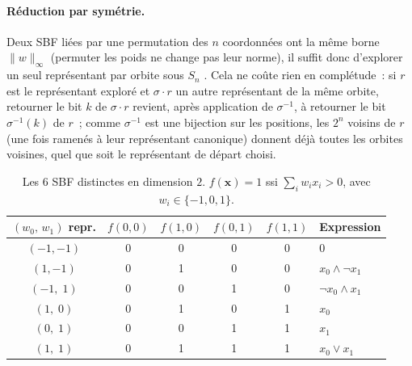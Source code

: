\paragraph{Réduction par symétrie.} Deux SBF liées par une permutation des $n$ coordonnées ont la même borne $\|w\|_\infty$ (permuter les poids ne change pas leur norme), il suffit donc d'explorer un seul représentant par orbite sous $S_n$ . Cela ne coûte rien en complétude~: si $r$ est le représentant exploré et $\sigma \cdot r$ un autre représentant de la même orbite, retourner le bit $k$ de $\sigma\cdot r$ revient, après application de $\sigma^{-1}$, à retourner le bit $\sigma^{-1}(k)$ de $r$~; comme $\sigma^{-1}$ est une bijection sur les positions, les $2^n$ voisins de $r$ (une fois ramenés à leur représentant canonique) donnent déjà toutes les orbites voisines, quel que soit le représentant de départ choisi.


\begin{table}[H]
\centering
\caption{Les 6 SBF distinctes en dimension $2$. $f(\mathbf{x}) = 1$ ssi $\sum_i w_i x_i > 0$, avec $w_i \in \{-1, 0, 1\}$.}
\label{tab:sbf2}
\begin{tabular}{cccccl}
\toprule
$(w_0,\,w_1)$ repr. & $f(0,0)$ & $f(1,0)$ & $f(0,1)$ & $f(1,1)$ & Expression \\
\midrule
$(-1,-1)$ & 0 & 0 & 0 & 0 & $0$ \\
$(1,-1)$  & 0 & 1 & 0 & 0 & $x_0 \wedge \neg x_1$ \\
$(-1,\;1)$  & 0 & 0 & 1 & 0 & $\neg x_0 \wedge x_1$ \\
$(1,\;0)$   & 0 & 1 & 0 & 1 & $x_0$ \\
$(0,\;1)$   & 0 & 0 & 1 & 1 & $x_1$ \\
$(1,\;1)$   & 0 & 1 & 1 & 1 & $x_0 \vee x_1$ \\
\bottomrule
\end{tabular}
\end{table}

